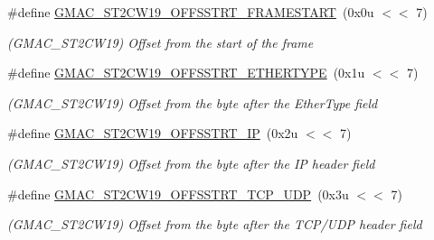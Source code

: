 \begin{DoxyCompactItemize}
\item 
\mbox{\label{group__SAME70__GMAC_ga1bcfeb7641bd8db6c40d5083b900c8c9}} 
\#define \mbox{\hyperlink{group__SAME70__GMAC_ga1bcfeb7641bd8db6c40d5083b900c8c9}{G\+M\+A\+C\+\_\+\+S\+T2\+C\+W19\+\_\+\+O\+F\+F\+S\+S\+T\+R\+T\+\_\+\+F\+R\+A\+M\+E\+S\+T\+A\+RT}}~(0x0u $<$$<$ 7)
\begin{DoxyCompactList}\small\item\em (G\+M\+A\+C\+\_\+\+S\+T2\+C\+W19) Offset from the start of the frame \end{DoxyCompactList}\item 
\mbox{\label{group__SAME70__GMAC_gaccdac09bbdcae7bf4d4c3be15b52c696}} 
\#define \mbox{\hyperlink{group__SAME70__GMAC_gaccdac09bbdcae7bf4d4c3be15b52c696}{G\+M\+A\+C\+\_\+\+S\+T2\+C\+W19\+\_\+\+O\+F\+F\+S\+S\+T\+R\+T\+\_\+\+E\+T\+H\+E\+R\+T\+Y\+PE}}~(0x1u $<$$<$ 7)
\begin{DoxyCompactList}\small\item\em (G\+M\+A\+C\+\_\+\+S\+T2\+C\+W19) Offset from the byte after the Ether\+Type field \end{DoxyCompactList}\item 
\mbox{\label{group__SAME70__GMAC_ga91613726c9fea2c61d5dbbb8499fdc2a}} 
\#define \mbox{\hyperlink{group__SAME70__GMAC_ga91613726c9fea2c61d5dbbb8499fdc2a}{G\+M\+A\+C\+\_\+\+S\+T2\+C\+W19\+\_\+\+O\+F\+F\+S\+S\+T\+R\+T\+\_\+\+IP}}~(0x2u $<$$<$ 7)
\begin{DoxyCompactList}\small\item\em (G\+M\+A\+C\+\_\+\+S\+T2\+C\+W19) Offset from the byte after the IP header field \end{DoxyCompactList}\item 
\mbox{\label{group__SAME70__GMAC_gadc80cd80a0d1aeb794b4de4995281f07}} 
\#define \mbox{\hyperlink{group__SAME70__GMAC_gadc80cd80a0d1aeb794b4de4995281f07}{G\+M\+A\+C\+\_\+\+S\+T2\+C\+W19\+\_\+\+O\+F\+F\+S\+S\+T\+R\+T\+\_\+\+T\+C\+P\+\_\+\+U\+DP}}~(0x3u $<$$<$ 7)
\begin{DoxyCompactList}\small\item\em (G\+M\+A\+C\+\_\+\+S\+T2\+C\+W19) Offset from the byte after the T\+C\+P/\+U\+DP header field \end{DoxyCompactList}\item 
\mbox{\label{group__SAME70__GMAC_gaeff1ab3d65c3405c252d25708d4363c4}} 

\end{DoxyCompactItemize}
